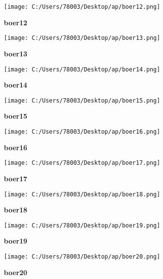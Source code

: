 \documentclass[UTF8]{report}
\theoremstyle{MyLineTheoremStyle} %
\theoremstyle{MyBlockTheoremStyle} %
\theoremstyle{MySubsubsectionStyle} %
\begin{document}
\begin{figure}[ht]
    \centering
    \texttt{[image: C:/Users/78003/Desktop/ap/boer12.png]}
    \caption{\textbf{boer12}}
    \label{fig:boer12}
\end{figure}

\begin{figure}[ht]
    \centering
    \texttt{[image: C:/Users/78003/Desktop/ap/boer13.png]}
    \caption{\textbf{boer13}}
    \label{fig:boer13}
\end{figure}

\begin{figure}[ht]
    \centering
    \texttt{[image: C:/Users/78003/Desktop/ap/boer14.png]}
    \caption{\textbf{boer14}}
    \label{fig:boer14}
\end{figure}

\begin{figure}[ht]
    \centering
    \texttt{[image: C:/Users/78003/Desktop/ap/boer15.png]}
    \caption{\textbf{boer15}}
    \label{fig:boer15}
\end{figure}

\begin{figure}[ht]
    \centering
    \texttt{[image: C:/Users/78003/Desktop/ap/boer16.png]}
    \caption{\textbf{boer16}}
    \label{fig:boer16}
\end{figure}

\begin{figure}[ht]
    \centering
    \texttt{[image: C:/Users/78003/Desktop/ap/boer17.png]}
    \caption{\textbf{boer17}}
    \label{fig:boer17}
\end{figure}

\begin{figure}[ht]
    \centering
    \texttt{[image: C:/Users/78003/Desktop/ap/boer18.png]}
    \caption{\textbf{boer18}}
    \label{fig:boer18}
\end{figure}

\begin{figure}[ht]
    \centering
    \texttt{[image: C:/Users/78003/Desktop/ap/boer19.png]}
    \caption{\textbf{boer19}}
    \label{fig:boer19}
\end{figure}

\begin{figure}[ht]
    \centering
    \texttt{[image: C:/Users/78003/Desktop/ap/boer20.png]}
    \caption{\textbf{boer20}}
    \label{fig:boer20}
\end{figure}
\end{document}
